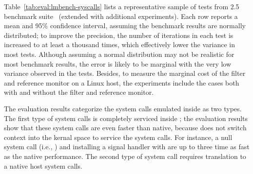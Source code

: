 Table~\ref{tab:eval:lmbench-syscalls} lists 
a representative sample of 
tests from \lmbench{} 2.5 benchmark suite~\cite{McVoy:lmbench}
(extended with additional experiments).
Each row reports a mean and 95\% confidence interval,
assuming the benchmark results are normally distributed;
to improve the precision,
the number of iterations in each test is increased to at least a thousand times, which effectively lower the variance
in most tests.
Although assuming a normal distribution may not be realistic for most benchmark results,
the error is likely to be marginal with the very low variance
observed in the tests.
Besides, to measure the marginal cost of the \seccomp{} filter and reference monitor on a Linux host,
the experiments include the cases both with
and without the \seccomp{} filter and reference monitor.


The evaluation results categorize
the system calls emulated inside \thelibos{}
as two types.
The first type of system calls is completely serviced inside \thelibos{};
the evaluation results show that these system calls are even faster than native, because \thelibos{} does not switch context into the kernal space
to service the system calls.
For instance,
a null system call (i.e., ) and installing a signal handler with 
are up to three time as fast as the native performance.
The second type of system call requires translation to a native host system calls.



\label{eval:perf:streams}


